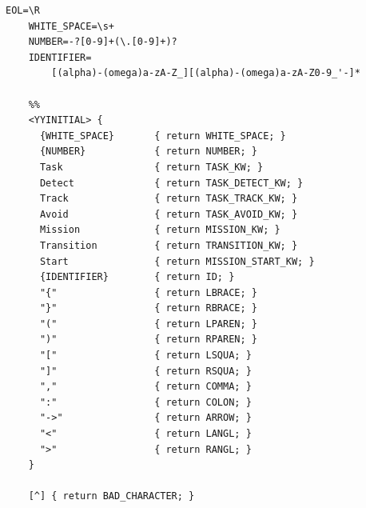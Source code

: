 \begin{lstlisting}[style=c1]
    EOL=\R
    WHITE_SPACE=\s+
    NUMBER=-?[0-9]+(\.[0-9]+)?
    IDENTIFIER=
        [(alpha)-(omega)a-zA-Z_][(alpha)-(omega)a-zA-Z0-9_'-]*
    
    %%
    <YYINITIAL> {
      {WHITE_SPACE}       { return WHITE_SPACE; }
      {NUMBER}            { return NUMBER; }
      Task                { return TASK_KW; }
      Detect              { return TASK_DETECT_KW; }
      Track               { return TASK_TRACK_KW; }
      Avoid               { return TASK_AVOID_KW; }
      Mission             { return MISSION_KW; }
      Transition          { return TRANSITION_KW; }
      Start               { return MISSION_START_KW; }
      {IDENTIFIER}        { return ID; }
      "{"                 { return LBRACE; }
      "}"                 { return RBRACE; }
      "("                 { return LPAREN; }
      ")"                 { return RPAREN; }
      "["                 { return LSQUA; }
      "]"                 { return RSQUA; }
      ","                 { return COMMA; }
      ":"                 { return COLON; }
      "->"                { return ARROW; }
      "<"                 { return LANGL; }
      ">"                 { return RANGL; }
    }
    
    [^] { return BAD_CHARACTER; }
\end{lstlisting}

